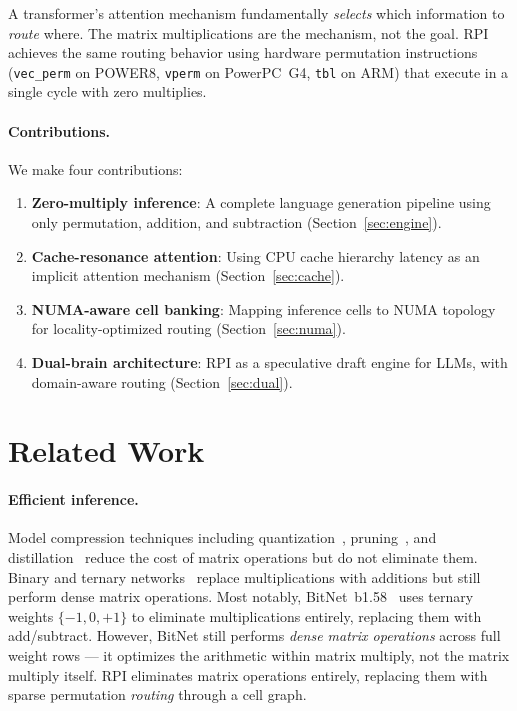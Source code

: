 \documentclass[10pt,twocolumn]{article}
\begin{document}
A transformer's attention mechanism fundamentally \emph{selects} which information to \emph{route} where. The matrix multiplications are the mechanism, not the goal. RPI achieves the same routing behavior using hardware permutation instructions (\texttt{vec\_perm} on POWER8, \texttt{vperm} on PowerPC~G4, \texttt{tbl} on ARM) that execute in a single cycle with zero multiplies.

\paragraph{Contributions.} We make four contributions:

\begin{enumerate}
\item \textbf{Zero-multiply inference}: A complete language generation pipeline using only permutation, addition, and subtraction (Section~\ref{sec:engine}).
\item \textbf{Cache-resonance attention}: Using CPU cache hierarchy latency as an implicit attention mechanism (Section~\ref{sec:cache}).
\item \textbf{NUMA-aware cell banking}: Mapping inference cells to NUMA topology for locality-optimized routing (Section~\ref{sec:numa}).
\item \textbf{Dual-brain architecture}: RPI as a speculative draft engine for LLMs, with domain-aware routing (Section~\ref{sec:dual}).
\end{enumerate}

\section{Related Work}
\label{sec:related}

\paragraph{Efficient inference.} Model compression techniques including quantization~\cite{dettmers2022gptq, frantar2023gptq}, pruning~\cite{frantar2023sparsegpt}, and distillation~\cite{hinton2015distilling} reduce the cost of matrix operations but do not eliminate them. Binary and ternary networks~\cite{courbariaux2016bnn, li2016ternary} replace multiplications with additions but still perform dense matrix operations. Most notably, BitNet~b1.58~\cite{ma2024bitnet} uses ternary weights $\{-1, 0, +1\}$ to eliminate multiplications entirely, replacing them with add/subtract. However, BitNet still performs \emph{dense matrix operations} across full weight rows --- it optimizes the arithmetic within matrix multiply, not the matrix multiply itself. RPI eliminates matrix operations entirely, replacing them with sparse permutation \emph{routing} through a cell graph.
\end{document}
